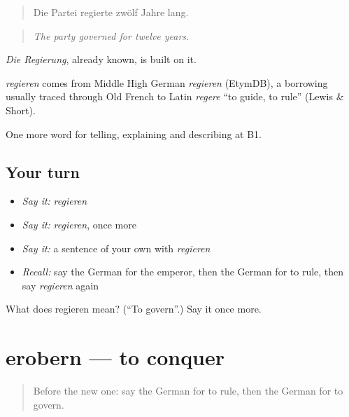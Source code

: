 \begin{quote}
Die Partei regierte zwölf Jahre lang.
\end{quote}

\begin{quote}
\emph{The party governed for twelve years.}
\end{quote}

\emph{Die Regierung}, already known, is built on it.

\begin{cousinweb}
\emph{regieren} comes from Middle High German \emph{regieren} (EtymDB), a borrowing usually traced through Old French to Latin \emph{regere} \textquotedblleft{}to guide, to rule\textquotedblright{} (Lewis \& Short).
\end{cousinweb}

\begin{grammarlens}[title={What you've built}]
One more word for telling, explaining and describing at B1.
\end{grammarlens}

\subsection*{Your turn}
\begin{itemize}
\raggedright
  \item \emph{Say it:} \emph{regieren}
  \item \emph{Say it:} \emph{regieren}, once more
  \item \emph{Say it:} a sentence of your own with \emph{regieren}
  \item \emph{Recall:} say the German for the emperor, then the German for to rule, then say \emph{regieren} again
\end{itemize}

\begin{tcolorbox}[breakable,colback=teal!4,colframe=teal!35!black,title={Before you move on}]
What does regieren mean? (\textquotedblleft{}To govern\textquotedblright{}.) Say it once more.
\end{tcolorbox}
\section[erobern]{erobern — to conquer}

\label{lesson:GE-C319-erobern}



\begin{quote}
Before the new one: say the German for to rule, then the German for to govern.
\end{quote}

